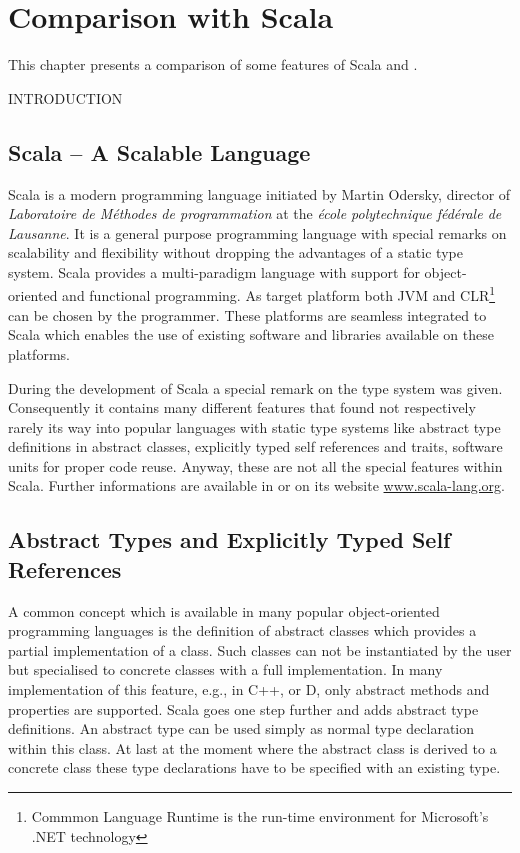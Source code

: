 \chapter{Comparison with Scala}
\label{sec:comparisonScala}
This chapter presents a comparison of some features of Scala and \ooplss.

INTRODUCTION

\section{Scala -- A Scalable Language}
Scala is a modern programming language initiated by Martin Odersky,
director of \emph{Laboratoire de Méthodes de programmation} at the
\emph{école polytechnique fédérale de Lausanne}. It is a general
purpose programming language with special remarks on scalability
and flexibility without dropping the advantages of a static type
system. Scala provides a multi-paradigm language with support for
object-oriented and functional programming. As target platform both JVM
and CLR\footnote{Commmon Language Runtime is the run-time environment
for Microsoft's .NET technology} can be chosen by the programmer. These
platforms are seamless integrated to Scala which enables the use of
existing software and libraries available on these platforms.

During the development of Scala a special remark on the type system
was given. Consequently it contains many different features that
found not respectively rarely its way into popular languages with
static type systems like abstract type definitions in abstract
classes, explicitly typed self references and traits, software
units for proper code reuse.  Anyway, these are not all the
special features within Scala. Further informations are available in
\cite{odersky_scala_2010,odersky_programming_2008} or on its website
\href{http://www.scala-lang.org/}{www.scala-lang.org}.

\section{Abstract Types and Explicitly Typed Self References}
A common concept which is available in many popular object-oriented
programming languages is the definition of abstract classes which
provides a partial implementation of a class. Such classes can not be
instantiated by the user but specialised to concrete classes with a full
implementation.  In many implementation of this feature, e.g., in C++,
\cs or D, only abstract methods and properties are supported. Scala goes
one step further and adds abstract type definitions. An abstract type
can be used simply as normal type declaration within this class. At last
at the moment where the abstract class is derived to a concrete class
these type declarations have to be specified with an existing type.

